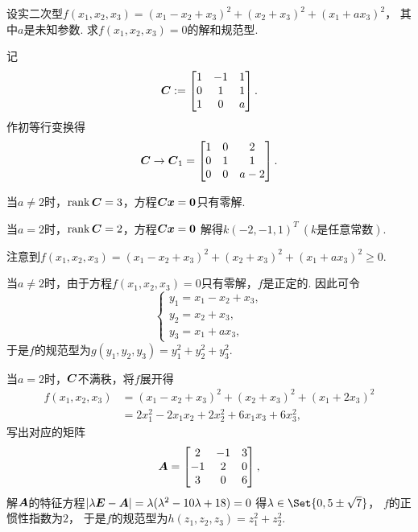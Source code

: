 \begin{example}
设实二次型\(f(x_1,x_2,x_3) = (x_1-x_2+x_3)^2 + (x_2+x_3)^2 + (x_1+ax_3)^2\)，
其中\(a\)是未知参数.
求\(f(x_1,x_2,x_3)=0\)的解和规范型.
\begin{solution}
记\[
	\boldsymbol{C} := \begin{bmatrix}
		1 & -1 & 1 \\
		0 & 1 & 1 \\
		1 & 0 & a
	\end{bmatrix}.
\]
作初等行变换得\[
	\boldsymbol{C} \to \boldsymbol{C}_1 = \begin{bmatrix}
		1 & 0 & 2 \\
		0 & 1 & 1 \\
		0 & 0 & a-2
	\end{bmatrix}.
\]

当\(a\neq2\)时，\(\rank\boldsymbol{C}=3\)，方程\(\boldsymbol{C}\boldsymbol{x}=\boldsymbol0\)只有零解.

当\(a=2\)时，\(\rank\boldsymbol{C}=2\)，方程\(\boldsymbol{C}\boldsymbol{x}=\boldsymbol0\)
解得\(k (-2,-1,1)^T\ (\text{$k$是任意常数})\).

注意到\(f(x_1,x_2,x_3) = (x_1-x_2+x_3)^2 + (x_2+x_3)^2 + (x_1+ax_3)^2 \geq 0\).

当\(a\neq2\)时，由于方程\(f(x_1,x_2,x_3)=0\)只有零解，\(f\)是正定的.
因此可令\[
	\left\{ \begin{array}{l}
		y_1 = x_1-x_2+x_3, \\
		y_2 = x_2+x_3, \\
		y_3 = x_1+ax_3,
	\end{array} \right.
\]
于是\(f\)的规范型为\(g(y_1,y_2,y_3) = y_1^2 + y_2^2 + y_3^2\).

当\(a=2\)时，\(\boldsymbol{C}\)不满秩，将\(f\)展开得\begin{align*}
	f(x_1,x_2,x_3) &= (x_1-x_2+x_3)^2 + (x_2+x_3)^2 + (x_1+2x_3)^2 \\
	&= 2 x_1^2 - 2 x_1 x_2 + 2 x_2^2 + 6 x_1 x_3 + 6 x_3^2,
\end{align*}
写出对应的矩阵\[
	\boldsymbol{A} = \begin{bmatrix}
		2 & -1 & 3 \\
		-1 & 2 & 0 \\
		3 & 0 & 6
	\end{bmatrix},
\]
解\(\boldsymbol{A}\)的特征方程\(\abs{\lambda\boldsymbol{E}-\boldsymbol{A}}=\lambda(\lambda^2-10\lambda+18)=0\)
得\(\lambda\in\Set{0,5\pm\sqrt7}\)，
\(f\)的正惯性指数为\(2\)，
于是\(f\)的规范型为\(h(z_1,z_2,z_3) = z_1^2+z_2^2\).
\end{solution}
\end{example}

